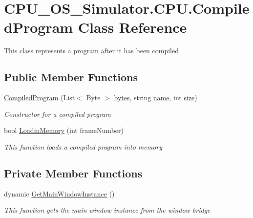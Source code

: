 \hypertarget{class_c_p_u___o_s___simulator_1_1_c_p_u_1_1_compiled_program}{}\section{C\+P\+U\+\_\+\+O\+S\+\_\+\+Simulator.\+C\+P\+U.\+Compiled\+Program Class Reference}
\label{class_c_p_u___o_s___simulator_1_1_c_p_u_1_1_compiled_program}


This class represents a program after it has been compiled  


\subsection*{Public Member Functions}
\begin{DoxyCompactItemize}
\item 
\hyperlink{class_c_p_u___o_s___simulator_1_1_c_p_u_1_1_compiled_program_a2831900227a696c5e2cc71d08b4cb0a0}{Compiled\+Program} (List$<$ Byte $>$ \hyperlink{class_c_p_u___o_s___simulator_1_1_c_p_u_1_1_compiled_program_a2fff029de4cf0be48a4ef07daabf04e7}{bytes}, string \hyperlink{class_c_p_u___o_s___simulator_1_1_c_p_u_1_1_compiled_program_afa16131ff99534fd4fe9bc4aaa21ac02}{name}, int \hyperlink{class_c_p_u___o_s___simulator_1_1_c_p_u_1_1_compiled_program_ac3d1adb46ebd2132f53d3a1b880acc58}{size})
\begin{DoxyCompactList}\small\item\em Constructor for a compiled program \end{DoxyCompactList}\item 
bool \hyperlink{class_c_p_u___o_s___simulator_1_1_c_p_u_1_1_compiled_program_ac046a32b0bd513aa4c7337ac987500c4}{Loadin\+Memory} (int frame\+Number)
\begin{DoxyCompactList}\small\item\em This function loads a compiled program into memory \end{DoxyCompactList}\end{DoxyCompactItemize}
\subsection*{Private Member Functions}
\begin{DoxyCompactItemize}
\item 
dynamic \hyperlink{class_c_p_u___o_s___simulator_1_1_c_p_u_1_1_compiled_program_a7cc5523ba4a83ee2842b246c83721be4}{Get\+Main\+Window\+Instance} ()
\begin{DoxyCompactList}\small\item\em This function gets the main window instance from the window bridge \end{DoxyCompactList}\end{DoxyCompactItemize}
